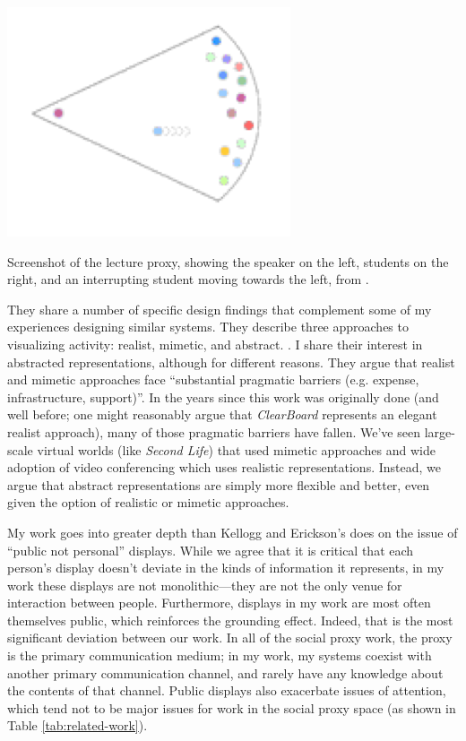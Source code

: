 \documentclass{tufte-handout}
\begin{document}
\begin{marginfigure}
	\includegraphics{figures/lecture.png}
	\caption{Screenshot of the lecture proxy, showing the speaker on the left, students on the right, and an interrupting student moving towards the left, from \citep{Erickson:2003td}.}
	\label{fig:proxy-lecture}
\end{marginfigure}

They share a number of specific design findings that complement some of my experiences designing similar systems. They describe three approaches to visualizing activity: realist, mimetic, and abstract. \citep{Erickson:2003td}. I share their interest in abstracted representations, although for different reasons. They argue that realist and mimetic approaches face ``substantial pragmatic barriers (e.g. expense, infrastructure, support)''. In the years since this work was originally done (and well before; one might reasonably argue that \emph{ClearBoard} \citep{Ishii:1992bq} represents an elegant realist approach), many of those pragmatic barriers have fallen. We've seen large-scale virtual worlds (like \emph{Second Life}) that used mimetic approaches and wide adoption of video conferencing which uses realistic representations. Instead, we argue that abstract representations are simply more flexible and better, even given the option of realistic or mimetic approaches.


My work goes into greater depth than Kellogg and Erickson's does on the issue of ``public not personal'' displays. While we agree that it is critical that each person's display doesn't deviate in the kinds of information it represents, in my work these displays are not monolithic---they are not the only venue for interaction between people. Furthermore, displays in my work are most often themselves public, which reinforces the grounding effect. Indeed, that is the most significant deviation between our work. In all of the social proxy work, the proxy is the primary communication medium; in my work, my systems coexist with another primary communication channel, and rarely have any knowledge about the contents of that channel. Public displays also exacerbate issues of attention, which tend not to be major issues for work in the social proxy space (as shown in Table \ref{tab:related-work}). 
\end{document}
